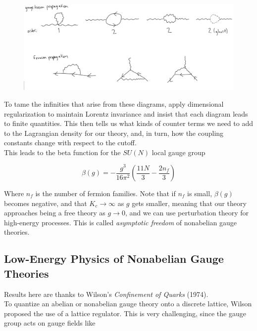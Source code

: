\begin{figure}[H]
	\centering
	\includegraphics[width=5in]{images/beta_nagauge_div.png}
	\caption*{}
\end{figure}

\noindent To tame the infinities that arise from these diagrams, apply dimensional regularization to maintain Lorentz invariance and insist that each diagram leads to finite quantities. This then tells us what kinds of counter terms we need to add to the Lagrangian density for our theory, and, in turn, how the coupling constants change with respect to the cutoff. \\

\noindent This leads to the beta function for the $SU(N)$ local gauge group 

\begin{equation}
\beta(g) = - \frac{g^3}{16 \pi^2} \left( \frac{11 N}{3} - \frac{2 n_f}{3} \right)
\end{equation}

\noindent Where $n_f$ is the number of fermion families. Note that if $n_f$ is small, $\beta(g)$ becomes negative, and that $K_c \rightarrow \infty$ as $g$ gets smaller, meaning that our theory approaches being a free theory as $g \rightarrow 0$, and we can use perturbation theory for high-energy processes. This is called \textit{asymptotic freedom} of nonabelian gauge theories. \\

\subsection*{Low-Energy Physics of Nonabelian Gauge Theories}

\noindent Results here are thanks to Wilson's \textit{Confinement of Quarks} (1974). \\

\noindent To quantize an abelian or nonabelian gauge theory onto a discrete lattice, Wilson proposed the use of a lattice regulator. This is very challenging, since the gauge group acts on gauge fields like

